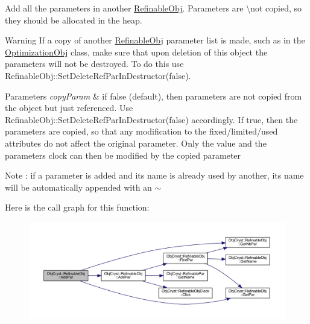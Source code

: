 Add all the parameters in another \mbox{\hyperlink{class_obj_cryst_1_1_refinable_obj}{Refinable\+Obj}}. Parameters are \textbackslash{}not copied, so they should be allocated in the heap.

\begin{DoxyWarning}{Warning}
If a copy of another \mbox{\hyperlink{class_obj_cryst_1_1_refinable_obj}{Refinable\+Obj}} parameter list is made, such as in the \mbox{\hyperlink{class_obj_cryst_1_1_optimization_obj}{Optimization\+Obj}} class, make sure that upon deletion of this object the parameters will not be destroyed. To do this use Refinable\+Obj\+::\+Set\+Delete\+Ref\+Par\+In\+Destructor(false).
\end{DoxyWarning}

\begin{DoxyParams}{Parameters}
{\em copy\+Param} & if false (default), then parameters are not copied from the object but just referenced. Use Refinable\+Obj\+::\+Set\+Delete\+Ref\+Par\+In\+Destructor(false) accordingly. If true, then the parameters are copied, so that any modification to the fixed/limited/used attributes do not affect the original parameter. Only the value and the parameter\textquotesingle{}s clock can then be modified by the copied parameter\\
\hline
\end{DoxyParams}
\begin{DoxyNote}{Note}
\+: if a parameter is added and its name is already used by another, its name will be automatically appended with an $\sim$ 
\end{DoxyNote}
Here is the call graph for this function\+:
\nopagebreak
\begin{figure}[H]
\begin{center}
\leavevmode
\includegraphics[width=350pt]{class_obj_cryst_1_1_refinable_obj_a6a28259e473fadd53fbc9b9bf7930813_cgraph}
\end{center}
\end{figure}
\mbox{\label{class_obj_cryst_1_1_refinable_obj_a0eec1ccf5ba9769e5c6a82a85ecf451d}} 
